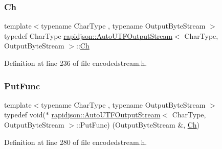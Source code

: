 \subsubsection{\texorpdfstring{Ch}{Ch}}
{\footnotesize\ttfamily template$<$typename Char\+Type , typename Output\+Byte\+Stream $>$ \\
typedef Char\+Type \mbox{\hyperlink{classrapidjson_1_1_auto_u_t_f_output_stream}{rapidjson\+::\+Auto\+U\+T\+F\+Output\+Stream}}$<$ Char\+Type, Output\+Byte\+Stream $>$\+::\mbox{\hyperlink{classrapidjson_1_1_auto_u_t_f_output_stream_aaf40884d8f4fbf24ea040d3363c9967e}{Ch}}}



Definition at line 236 of file encodedstream.\+h.

\mbox{\label{classrapidjson_1_1_auto_u_t_f_output_stream_a2572eb3b4d77c0a2466ba21635ff79b5}} 
\subsubsection{\texorpdfstring{PutFunc}{PutFunc}}
{\footnotesize\ttfamily template$<$typename Char\+Type , typename Output\+Byte\+Stream $>$ \\
typedef void($\ast$ \mbox{\hyperlink{classrapidjson_1_1_auto_u_t_f_output_stream}{rapidjson\+::\+Auto\+U\+T\+F\+Output\+Stream}}$<$ Char\+Type, Output\+Byte\+Stream $>$\+::Put\+Func) (Output\+Byte\+Stream \&, \mbox{\hyperlink{classrapidjson_1_1_auto_u_t_f_output_stream_aaf40884d8f4fbf24ea040d3363c9967e}{Ch}})\hspace{0.3cm}{\ttfamily [private]}}



Definition at line 280 of file encodedstream.\+h.

\mbox{\label{classrapidjson_1_1_auto_u_t_f_output_stream_ab9516a450189bd1bde6dff768d745791}} 
